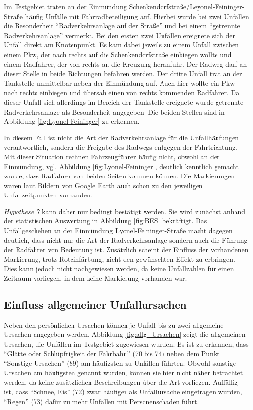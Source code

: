 Im Testgebiet traten an der Einmündung Schenkendorfstraße/Leyonel-Feininger-Straße häufig Unfälle mit Fahrradbeteiligung auf. Hierbei wurde bei zwei Unfällen die Besonderheit \enquote{Radverkehrsanlage auf der Straße} und bei einem \enquote{getrennte Radverkehrsanlage} vermerkt. Bei den ersten zwei Unfällen ereignete sich der Unfall direkt am Knotenpunkt. Es kam dabei jeweils zu einem Unfall zwischen einem Pkw, der nach rechts auf die Schenkendorfstraße einbiegen wollte und einem Radfahrer, der von rechts an die Kreuzung heranfuhr. Der Radweg darf an dieser Stelle in beide Richtungen befahren werden. Der dritte Unfall trat an der Tankstelle unmittelbar neben der Einmündung auf. Auch hier wollte ein Pkw nach rechts einbiegen und übersah einen von rechts kommenden Radfahrer. Da dieser Unfall sich allerdings im Bereich der Tankstelle ereignete wurde getrennte Radverkehrsanlage als Besonderheit angegeben. Die beiden Stellen sind in Abbildung \ref{fig:Lyonel-Feininger} zu erkennen.

In diesem Fall ist nicht die Art der Radverkehrsanlage für die Unfallhäufungen verantwortlich, sondern die Freigabe des Radwegs entgegen der Fahrtrichtung. Mit dieser Situation rechnen Fahrzeugführer häufig nicht, obwohl an der Einmündung, vgl. Abbildung \ref{fig:Lyonel-Feininger}, deutlich kenntlich gemacht wurde, dass Radfahrer von beiden Seiten kommen können. Die Markierungen waren laut Bildern von Google Earth auch schon zu den jeweiligen Unfallzeitpunkten vorhanden.

\textit{Hypothese 7} kann daher nur bedingt bestätigt werden. Sie wird zunächst anhand der statistischen Auswertung in Abbildung \ref{fig:BES} bekräftigt. Das Unfallgeschehen an der Einmündung Lyonel-Feininger-Straße macht dagegen deutlich, dass nicht nur die Art der Radverkehrsanlage sondern auch die Führung der Radfahrer von Bedeutung ist. Zusätzlich scheint der Einfluss der vorhandenen Markierung, trotz Roteinfärbung, nicht den gewünschten Effekt zu erbringen. Dies kann jedoch nicht nachgewiesen werden, da keine Unfallzahlen für einen Zeitraum vorliegen, in dem keine Markierung vorhanden war. 


\subsection{Einfluss allgemeiner Unfallursachen}
Neben den persönlichen Ursachen können je Unfall bis zu zwei allgemeine Ursachen angegeben werden. Abbildung \ref{fig:allg_Ursachen} zeigt die allgemeinen Ursachen, die Unfällen im Testgebiet zugewiesen wurden. Es ist zu erkennen, dass \enquote{Glätte oder Schlüpfrigkeit der Fahrbahn} (70 bis 74) neben dem Punkt \enquote{Sonstige Ursachen} (89) am häufigsten zu Unfällen führten. Obwohl sonstige Ursachen am häufigsten genannt wurden, können sie hier nicht näher betrachtet werden, da keine zusätzlichen Beschreibungen über die Art vorliegen. Auffällig ist, dass \enquote{Schnee, Eis} (72) zwar häufiger als Unfallursache eingetragen wurden, \enquote{Regen} (73) dafür zu mehr Unfällen mit Personenschaden führt. 

